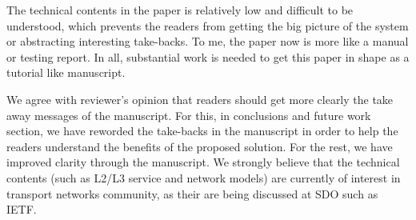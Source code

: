 \documentclass[12pt]{journalrebuttal}
\begin{document}
\begin{revcomment}
The technical contents in the paper is relatively low and difficult to be understood, which prevents the readers from getting the big picture of the system or abstracting interesting take-backs. To me, the paper now is more like a manual or testing report. In all, substantial work is needed to get this paper in shape as a tutorial like manuscript.
\end{revcomment}

\begin{response}
We agree with reviewer's opinion that readers should get more clearly the take away messages of the manuscript. For this, in conclusions and future work section, we have reworded the take-backs in the manuscript in order to help the readers understand the benefits of the proposed solution. For the rest, we have improved clarity through the manuscript. We strongly believe that the technical contents (such as L2/L3 service and network models) are currently of interest in transport networks community, as their are being discussed at SDO such as IETF. 

\end{response}
\end{document}
